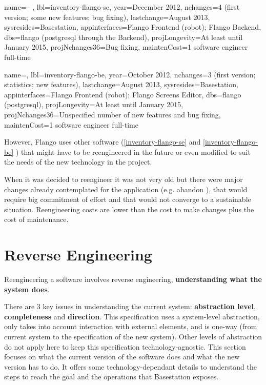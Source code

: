 \begin{inventory}
{
name=\flangofe -- \se , 
lbl=inventory-flango-se, 
year=December 2012,
nchanges=4 (first version; some new features; bug fixing),
lastchange=August 2013,
sysresides=Basestation,
appinterfaces=Flango Frontend (robot); Flango Backend,
dbs=flango (postgresql through the Backend),
projLongevity=At least until January 2015,
projNchanges36=Bug fixing,
maintenCost=1 software engineer full-time
}
\end{inventory}

\begin{inventory}
{
name=\flangobe , 
lbl=inventory-flango-be, 
year=October 2012,
nchanges=3 (first version; statistics; new features),
lastchange=August 2013,
sysresides=Basestation,
appinterfaces=Flango Frontend (robot); Flango Screens Editor,
dbs=flango (postgresql),
projLongevity=At least until January 2015,
projNchanges36=Unspecified number of new features and bug fixing,
maintenCost=1 software engineer full-time
}
\end{inventory} 

However, Flango \cm uses other software (\ref{inventory-flango-se} and \ref{inventory-flango-be} ) that might have to be reengineered in the future or even modified to suit the needs of the new technology in the project.

When it was decided to reengineer \flangofe it was not very old but there were major changes already contemplated for the application (e.g. abandon \flash), that would require big commitment of effort and that would not converge to a sustainable situation.
Reengineering costs are lower than the cost to make changes plus the cost of maintenance.

\section{Reverse Engineering}
\label{sec:reverse-eng}
Reengineering a software involves reverse engineering, \textbf{understanding what the system does}.

There are 3 key issues in understanding the current system: \textbf{abstraction level}, \textbf{completeness} and \textbf{direction}.
This specification uses a system-level abstraction, only takes into account interaction with external elements, and is one-way (from current system to the specification of the new system).
Other levels of abstraction do not apply here to keep this specification technology-agnostic.
This section focuses on what the current version of the software does and what the new version has to do.
It offers some technology-dependant details to understand the steps to reach the goal and the operations that Basestation exposes.

